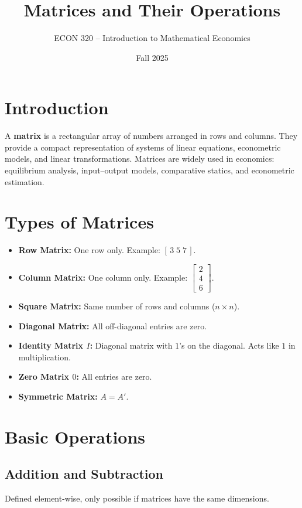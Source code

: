 \documentclass[11pt]{article}
\title{Matrices and Their Operations}
\author{ECON 320 -- Introduction to Mathematical Economics }
\date{Fall 2025}
\begin{document}
\maketitle



\section{Introduction}
A \textbf{matrix} is a rectangular array of numbers arranged in rows and columns. 
They provide a compact representation of systems of linear equations, econometric models, and linear transformations.
Matrices are widely used in economics: equilibrium analysis, input--output models, comparative statics, and econometric estimation.



\section{Types of Matrices}
\begin{itemize}
    \item \textbf{Row Matrix:} One row only. Example: $[\,3 \; 5 \; 7\,]$.
    \item \textbf{Column Matrix:} One column only. Example: $\begin{bmatrix} 2 \\ 4 \\ 6 \end{bmatrix}$.
    \item \textbf{Square Matrix:} Same number of rows and columns ($n\times n$).
    \item \textbf{Diagonal Matrix:} All off-diagonal entries are zero.
    \item \textbf{Identity Matrix $I$:} Diagonal matrix with $1$’s on the diagonal. Acts like $1$ in multiplication.
    \item \textbf{Zero Matrix $0$:} All entries are zero.
    \item \textbf{Symmetric Matrix:} $A = A'$.
\end{itemize}



\section{Basic Operations}
\subsection{Addition and Subtraction}
Defined element-wise, only possible if matrices have the same dimensions.
\end{document}
